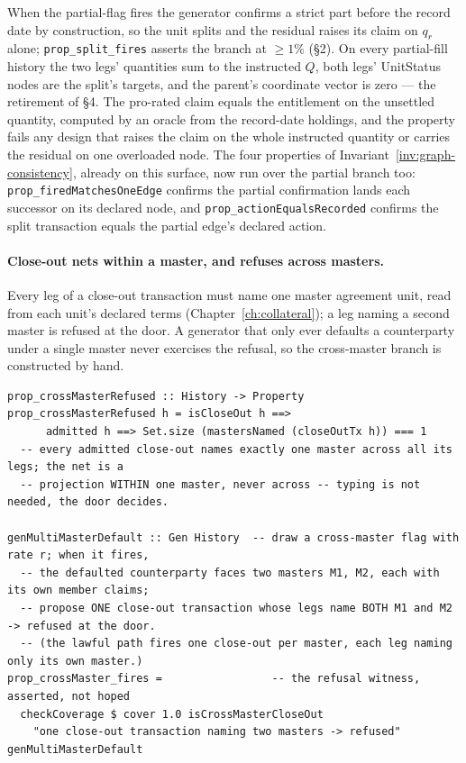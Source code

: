 \documentclass[11pt,a4paper]{article}
\begin{document}
When the partial-flag fires the generator confirms a strict part before the record date by
construction, so the unit splits and the residual raises its claim on $q_r$ alone;
\texttt{prop\_split\_fires} asserts the branch at $\ge 1\%$ (\S 2). On every partial-fill
history the two legs' quantities sum to the instructed $Q$, both legs' UnitStatus nodes are
the split's targets, and the parent's coordinate vector is zero --- the retirement of \S4.
The pro-rated claim equals the entitlement on the unsettled quantity, computed by an oracle
from the record-date holdings, and the property fails any design that raises the claim on the
whole instructed quantity or carries the residual on one overloaded node. The four properties
of Invariant~\ref{inv:graph-consistency}, already on this surface, now run over the partial
branch too: \texttt{prop\_firedMatchesOneEdge} confirms the partial confirmation lands each
successor on its declared node, and \texttt{prop\_actionEqualsRecorded} confirms the split
transaction equals the partial edge's declared action.

\paragraph{Close-out nets within a master, and refuses across masters.} Every leg of a
close-out transaction must name one master agreement unit, read from each unit's declared
terms (Chapter~\ref{ch:collateral}); a leg naming a second master is refused at the door. A
generator that only ever defaults a counterparty under a single master never exercises the
refusal, so the cross-master branch is constructed by hand.

\begin{lstlisting}
prop_crossMasterRefused :: History -> Property
prop_crossMasterRefused h = isCloseOut h ==>
      admitted h ==> Set.size (mastersNamed (closeOutTx h)) === 1
  -- every admitted close-out names exactly one master across all its legs; the net is a
  -- projection WITHIN one master, never across -- typing is not needed, the door decides.

genMultiMasterDefault :: Gen History  -- draw a cross-master flag with rate r; when it fires,
  -- the defaulted counterparty faces two masters M1, M2, each with its own member claims;
  -- propose ONE close-out transaction whose legs name BOTH M1 and M2 -> refused at the door.
  -- (the lawful path fires one close-out per master, each leg naming only its own master.)
prop_crossMaster_fires =                 -- the refusal witness, asserted, not hoped
  checkCoverage $ cover 1.0 isCrossMasterCloseOut
    "one close-out transaction naming two masters -> refused" genMultiMasterDefault
\end{lstlisting}
\end{document}
